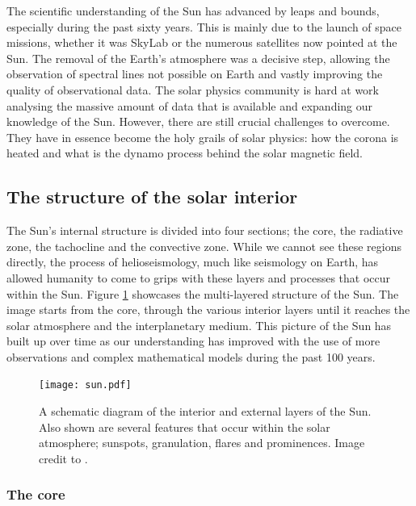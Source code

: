     The scientific understanding of the Sun has advanced by leaps and bounds, especially during the past sixty years.
    This is mainly due to the launch of space missions, whether it was SkyLab or the numerous satellites now pointed at the Sun.
    The removal of the Earth's atmosphere was a decisive step, allowing the observation of spectral lines not possible on Earth and vastly improving the quality of observational data.
    The solar physics community is hard at work analysing the massive amount of data that is available and expanding our knowledge of the Sun.   
    However, there are still crucial challenges to overcome.
    They have in essence become the holy grails of solar physics: how the corona is heated and what is the dynamo process behind the solar magnetic field.

\subsection{The structure of the solar interior}

    The Sun's internal structure is divided into four sections; the core, the radiative zone, the tachocline and the convective zone.
    While we cannot see these regions directly, the process of helioseismology, much like seismology on Earth, has allowed humanity to come to grips with these layers and processes that occur within the Sun.
    Figure \ref{fig:Sun} showcases the multi-layered structure of the Sun.
    The image starts from the core, through the various interior layers until it reaches the solar atmosphere and the interplanetary medium.
    This picture of the Sun has built up over time as our understanding has improved with the use of more observations and complex mathematical models during the past 100 years.
    
    \begin{figure}
        \centering
        \texttt{[image: sun.pdf]}
        \caption{
                A schematic diagram of the interior and external layers of the Sun.
                Also shown are several features that occur within the solar atmosphere; sunspots, granulation, flares and prominences.
                Image credit to \cite{sun_image}.
               }
        \label{fig:Sun}
    \end{figure}

\subsubsection{The core}

